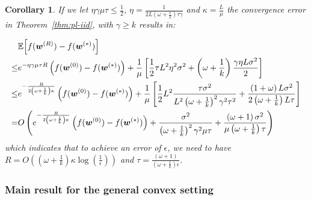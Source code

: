 \documentclass[sigconf, anonymous, review]{acmart}
\newtheorem{corollary}{Corollary}
\begin{document}
\begin{corollary}
If we  let $\eta\gamma\mu\tau\leq\frac{1}{2}$, $\eta=\frac{1}{2L\left(\omega+\frac{1}{k}\right)\tau\gamma }$ and $\kappa=\frac{L}{\mu}$ the convergence error in Theorem~\ref{thm:pl-iid}, with $\gamma\geq k$ results in:

\begin{align}\notag
&\mathbb{E}\Big[f({\boldsymbol{w}}^{(R)})-f({\boldsymbol{w}}^{(*)})\Big]\nonumber\\
\leq& e^{-\eta\gamma{\mu\tau}R}\left(f(\boldsymbol{w}^{(0)})-f(\boldsymbol{w}^{(*)})\right)+\frac{1}{{\mu}}\left[\frac{1}{2} \tau L^2\eta^2\sigma^2+\left(\omega+\frac{1}{k}\right)\frac{\gamma\eta L\sigma^2}{2}\right]\nonumber\\
\leq& e^{-\frac{R}{2\left(\omega+\frac{1}{k}\right)\kappa}}\left(f(\boldsymbol{w}^{(0)})-f(\boldsymbol{w}^{(*)})\right)+\frac{1}{{\mu}}\left[\frac{1}{2} L^2\frac{\tau\sigma^2}{L^2\left(\omega+\frac{1}{k}\right)^2\gamma^2\tau^2}+\frac{\left(1+\omega\right) L\sigma^2}{2\left(\omega+\frac{1}{k}\right)L\tau }\right]\nonumber\\
=&O\left(e^{-\frac{R}{2\left(\omega+\frac{1}{k}\right)\kappa}}\left(f(\boldsymbol{w}^{(0)})-f(\boldsymbol{w}^{(*)})\right)+\frac{\sigma^2}{\left(\omega+\frac{1}{k}\right)^2\gamma^2\mu\tau}+\frac{\left(\omega+1\right)\sigma^2}{\mu\left(\omega+\frac{1}{k}\right) \tau }\right)
\end{align}
which indicates  that to achieve an error of $\epsilon$, we need to have $R=O\left(\left(\omega+\frac{1}{k}\right)\kappa\log\left(\frac{1}{\epsilon}\right)\right)$ and $\tau=\frac{\left(\omega+1\right)}{\left(\omega+\frac{1}{k}\right)\epsilon}$. %
\end{corollary}

\subsubsection{Main result for the general convex setting}
\end{document}
